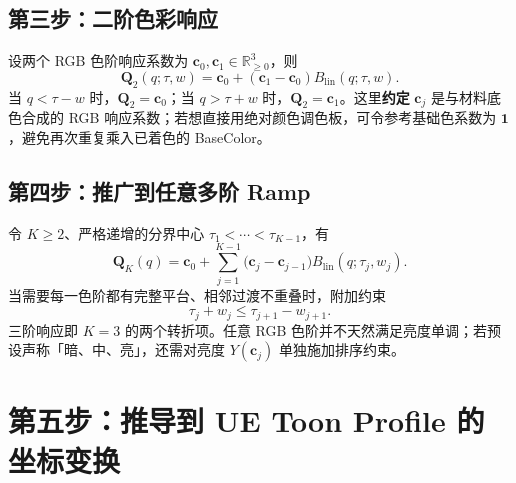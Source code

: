 \documentclass[UTF8,11pt,a4paper]{ctexart}
\numberwithin{equation}{section}
\begin{document}
\subsection{第三步：二阶色彩响应}
设两个 RGB 色阶响应系数为 $\mathbf c_0,\mathbf c_1\in\mathbb R_{\ge0}^3$，则
\begin{equation}
\boxed{\mathbf Q_2(q;\tau,w)=\mathbf c_0+(\mathbf c_1-\mathbf c_0)B_{\mathrm{lin}}(q;\tau,w).}
\label{eq:2band}
\end{equation}
当 $q<\tau-w$ 时，$\mathbf Q_2=\mathbf c_0$；当 $q>\tau+w$ 时，$\mathbf Q_2=\mathbf c_1$。这里\textbf{约定} $\mathbf c_j$ 是与材料底色合成的 RGB 响应系数；若想直接用绝对颜色调色板，可令参考基础色系数为 $\mathbf1$，避免再次重复乘入已着色的 BaseColor。

\subsection{第四步：推广到任意多阶 Ramp}
令 $K\ge2$、严格递增的分界中心 $\tau_1<\cdots<\tau_{K-1}$，有
\begin{equation}
\boxed{\mathbf Q_K(q)=\mathbf c_0+\sum_{j=1}^{K-1}
\bigl(\mathbf c_j-\mathbf c_{j-1}\bigr)B_{\mathrm{lin}}(q;\tau_j,w_j).}
\label{eq:kband}
\end{equation}
当需要每一色阶都有完整平台、相邻过渡不重叠时，附加约束
\begin{equation}
\tau_j+w_j\le\tau_{j+1}-w_{j+1}.
\label{eq:nonoverlap}
\end{equation}
三阶响应即 $K=3$ 的两个转折项。任意 RGB 色阶并不天然满足亮度单调；若预设声称「暗、中、亮」，还需对亮度 $Y(\mathbf c_j)$ 单独施加排序约束。

\section{第五步：推导到 UE Toon Profile 的坐标变换}
\end{document}
